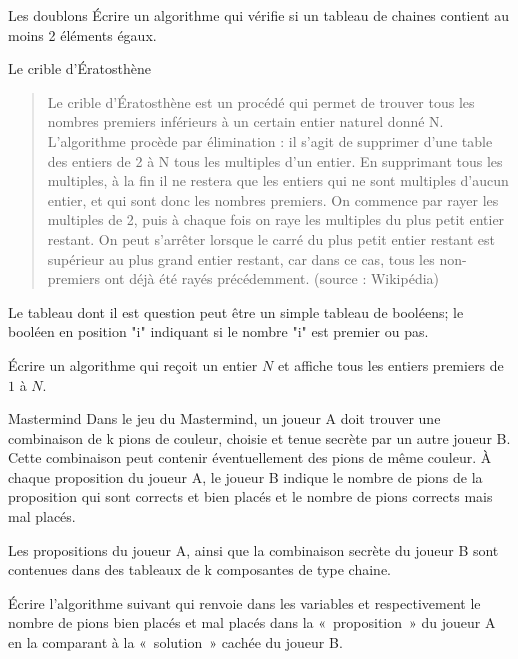 	\begin{Exercice}{Les doublons}
		Écrire un algorithme qui vérifie 
		si un tableau de chaines
		contient au moins 2 éléments égaux.
	\end{Exercice}	
	\bigskip
	
	\begin{Exercice}{Le crible d'Ératosthène}
		\begin{quote}
			\og{} Le crible d'Ératosthène est un procédé 
			qui permet de trouver tous les nombres premiers inférieurs 
			à un certain entier naturel donné N.
			L'algorithme procède par élimination : 
			il s'agit de supprimer d'une table des entiers de 2 à N 
			tous les multiples d'un entier. 
			En supprimant tous les multiples, 
			à la fin il ne restera que les entiers qui ne sont multiples d'aucun entier, 
			et qui sont donc les nombres premiers.
			On commence par rayer les multiples de 2, 
			puis à chaque fois on raye les multiples du plus petit entier restant.
			On peut s'arrêter lorsque le carré du plus petit entier restant 
			est supérieur au plus grand entier restant, car dans ce cas, 
			tous les non-premiers ont déjà été rayés précédemment.\fg{}
			(source : Wikipédia)
		\end{quote}
		Le tableau dont il est question peut être un simple tableau
		de booléens; le booléen en position "i" indiquant 
		si le nombre "i" est premier ou pas.

		Écrire un algorithme qui reçoit un entier $N$
		et affiche tous les entiers premiers de $1$ à $N$.
	\end{Exercice}
	
	\begin{Exercice}{Mastermind}
		Dans le jeu du Mastermind, 
		un joueur A doit trouver une combinaison de k pions de couleur, 
		choisie et tenue secrète par un autre joueur B. 
		Cette combinaison peut contenir éventuellement des pions de même couleur. 
		À chaque proposition du joueur A, 
		le joueur B indique le nombre de pions de la proposition 
		qui sont corrects et bien placés 
		et le nombre de pions corrects mais mal placés. 
		
		Les propositions du joueur A, 
		ainsi que la combinaison secrète du joueur B
		sont contenues dans des tableaux de k composantes de type chaine.
		
		Écrire l'algorithme suivant qui renvoie dans les variables
		 et 
		respectivement le nombre de pions bien placés et mal placés 
		dans la «~proposition~» du joueur A en la comparant 
		à la «~solution~» cachée du joueur B.
	
		\begin{LDA}
		\end{LDA}
	\end{Exercice}
	
